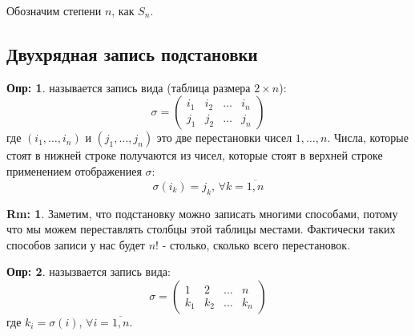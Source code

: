 \documentclass[12pt]{article}
\theoremstyle{definition}
\newtheorem{defn}{Опр:}
\newtheorem{rem}{Rm:}
\begin{document}
Обозначим  степени $n$, как $S_n$.

\subsection*{Двухрядная запись подстановки}
\begin{defn}
	 называется запись вида (таблица размера $2\times n$):	
	$$
		\sigma =	
		\begin{pmatrix}
			i_1 & i_2 & \dotsc & i_n \\
			j_1 & j_2 & \dotsc & j_n
		\end{pmatrix}
	$$
	где $(i_1,\dotsc,i_n)$ и $(j_1,\dotsc, j_n)$ это две перестановки чисел $1,\dotsc, n$. Числа, которые стоят в нижней строке получаются из чисел, которые стоят в верхней строке применением отображениея $\sigma$:
	$$
		\sigma(i_k) = j_k, \, \forall k = \overline{1,n}
	$$
\end{defn}
\begin{rem}
	Заметим, что подстановку можно записать многими способами, потому что мы можем переставлять столбцы этой таблицы местами. Фактически таких способов записи у нас будет $n!$ - столько, сколько всего перестановок.
\end{rem}

\begin{defn}
	 назызвается запись вида:
	$$
		\sigma = 
		\begin{pmatrix}
			1 & 2 & \dotsc & n \\
			k_1 & k_2 & \dotsc & k_n
		\end{pmatrix}
	$$
	где $k_i = \sigma(i), \, \forall i = \overline{1,n}$.
\end{defn}
\end{document}
